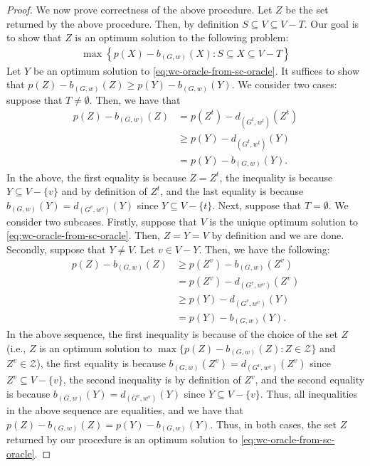 \documentclass{article}
\providecommand{\calZ}{\mathcal{Z}}
\begin{document}
\begin{proof}
We now prove correctness of the above procedure. Let $Z$ be the set returned by the above procedure. Then, by definition $S\subseteq V\subseteq V-T$. Our goal is to show that $Z$ is an optimum solution to the following problem:
\begin{align}
    \max\left\{p(X)-b_{(G, w)}(X): S\subseteq X\subseteq V-T\right\} \label{eq:wc-oracle-from-sc-oracle}
\end{align}
Let $Y$ be an optimum solution to \eqref{eq:wc-oracle-from-sc-oracle}. It suffices to show that $p(Z)-b_{(G, w)}(Z) \ge p(Y)-b_{(G, w)}(Y) $.   
We consider two cases: suppose that $T\neq \emptyset$. Then, we have that 
\begin{align*}
p(Z)-b_{(G, w)}(Z)
&=p(Z^t)-d_{(G^t, w^t)}(Z^t)\\
&\ge p(Y)-d_{(G^t, w^t)}(Y) \\
&= p(Y) - b_{(G, w)}(Y) .
\end{align*} 
In the above, the first equality is because $Z=Z^t$, the inequality is because $Y\subseteq V-\{v\}$ and by definition of $Z^t$, and the last equality is because $b_{(G, w)}(Y) = d_{(G^v, w^v)}(Y)$ since $Y\subseteq V-\{t\}$. 
Next, suppose that $T=\emptyset$. We consider two subcases. Firstly, suppose that $V$ is the unique optimum solution to \eqref{eq:wc-oracle-from-sc-oracle}. Then, $Z=Y=V$ by definition and we are done. 
Secondly, suppose that $Y\neq V$. Let $v\in V-Y$.  
Then, we have the following:
\begin{align*}
p(Z)-b_{(G, w)}(Z)
&\ge p(Z^v) - b_{(G, w)}(Z^v) \\
&=p(Z^v)-d_{(G^v, w^v)}(Z^v) \\
&\ge p(Y)-d_{(G^v, w^v)}(Y) \\
&=p(Y)-b_{(G, w)}(Y).
\end{align*} 
In the above sequence, the first inequality is because of the choice of the set $Z$ (i.e., $Z$ is an optimum solution to $\max\{p(Z)-b_{(G, w)}(Z): Z\in \calZ\}$ and $Z^v \in \calZ$), the first equality is because  $b_{(G, w)}(Z^v) = d_{(G^v, w^v)}(Z^v)$ since $Z^v\subseteq V-\{v\}$, the second inequality is by definition of $Z^v$, and the second equality is because $b_{(G, w)}(Y) = d_{(G^v, w^v)}(Y)$ since $Y\subseteq V-\{v\}$. Thus, all inequalities in the above sequence are equalities, and we have that $p(Z)-b_{(G, w)}(Z) = p(Y)-b_{(G, w)}(Y)$. Thus, in both cases, the set $Z$ returned by our procedure is an optimum solution to \eqref{eq:wc-oracle-from-sc-oracle}.


\end{proof}
\end{document}
